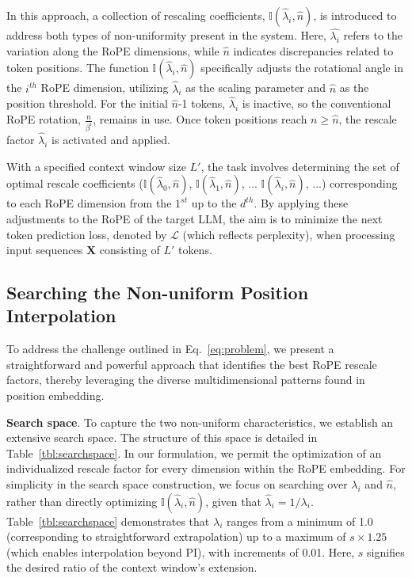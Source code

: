 In this approach, a collection of rescaling coefficients, $\mathbb{I}(\hat{\lambda}_{i},\hat{n})$, is introduced to address both types of non-uniformity present in the system. Here, $\hat{\lambda_i}$ refers to the variation along the RoPE dimensions, while $\hat{n}$ indicates discrepancies related to token positions. The function $\mathbb{I}(\hat{\lambda}_{i},\hat{n})$ specifically adjusts the rotational angle in the $i^{th}$ RoPE dimension, utilizing $\hat\lambda_{i}$ as the scaling parameter and $\hat{n}$ as the position threshold. For the initial $\hat{n}$-1 tokens, $\hat\lambda_{i}$ is inactive, so the conventional RoPE rotation, $\frac{n}{\beta^i}$, remains in use. Once token positions reach $n\ge\hat{n}$, the rescale factor $\hat\lambda_{i}$ is activated and applied.

With a specified context window size $L'$, the task involves determining the set of optimal rescale coefficients ($\mathbb{I}(\hat{\lambda}_{0},\hat{n})$, $\mathbb{I}(\hat{\lambda}_{1},\hat{n})$, ... $\mathbb{I}(\hat{\lambda}_{i},\hat{n})$, ...) corresponding to each RoPE dimension from the $1^{st}$ up to the $d^{th}$. By applying these adjustments to the RoPE of the target $\text{LLM}$, the aim is to minimize the next token prediction loss, denoted by $\mathcal{L}$ (which reflects perplexity), when processing input sequences $\mathbf{X}$ consisting of $L'$ tokens.

\subsection{Searching the Non-uniform Position Interpolation}

To address the challenge outlined in Eq.~\ref{eq:problem}, we present a straightforward and powerful approach that identifies the best RoPE rescale factors, thereby leveraging the diverse multidimensional patterns found in position embedding.

\textbf{Search space}. To capture the two non-uniform characteristics, we establish an extensive search space. The structure of this space is detailed in Table~\ref{tbl:searchspace}. In our formulation, we permit the optimization of an individualized rescale factor for every dimension within the RoPE embedding. For simplicity in the search space construction, we focus on searching over $\lambda_i$ and $\hat{n}$, rather than directly optimizing $\mathbb{I}(\hat{\lambda}_{i},\hat{n})$, given that $\hat{\lambda}_{i}=1/\lambda_i$. Table~\ref{tbl:searchspace} demonstrates that $\lambda_i$ ranges from a minimum of 1.0 (corresponding to straightforward extrapolation) up to a maximum of $s\times1.25$ (which enables interpolation beyond PI), with increments of 0.01. Here, $s$ signifies the desired ratio of the context window's extension.

